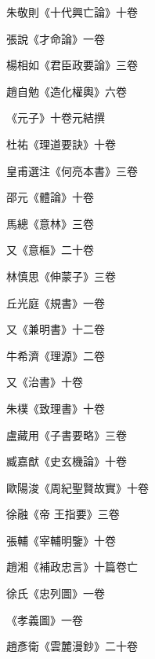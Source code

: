 \begin{pinyinscope}
 朱敬則《十代興亡論》十卷



 張說《才命論》一卷



 楊相如《君臣政要論》三卷



 趙自勉《造化權輿》六卷



 《元子》十卷元結撰



 杜祐《理道要訣》十卷



 皇甫選注《何亮本書》三卷



 邵元《體論》十卷



 馬總《意林》三卷



 又《意樞》二十卷



 林慎思《伸蒙子》三卷



 丘光庭《規書》一卷



 又《兼明書》十二卷



 牛希濟《理源》二卷



 又《治書》十卷



 朱樸《致理書》十卷



 盧藏用《子書要略》三卷



 臧嘉猷《史玄機論》十卷



 歐陽浚《周紀聖賢故實》十卷



 徐融《帝
 王指要》三卷



 張輔《宰輔明鑒》十卷



 趙湘《補政忠言》十篇卷亡



 徐氏《忠列圖》一卷



 《孝義圖》一卷



 趙彥衛《雲麓漫鈔》二十卷




\end{pinyinscope}
